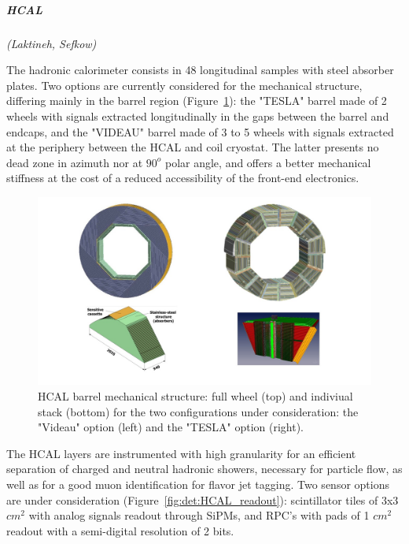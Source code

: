\vspace{1cm}
\subparagraph*{\bf HCAL}
\textit{(Laktineh, Sefkow)}

The hadronic calorimeter consists in 48 longitudinal samples with steel absorber plates. Two options are currently considered for the mechanical structure, differing mainly in the barrel region (Figure~\ref{fig:det:HCAL}): the "TESLA" barrel made of 2 wheels with signals extracted longitudinally in the gaps between the barrel and endcaps, and the "VIDEAU" barrel made of 3 to 5 wheels with signals extracted at the periphery between the HCAL and coil cryostat. The latter presents no dead zone in azimuth nor at $90^o$ polar angle, and offers a better mechanical stiffness at the cost of a reduced accessibility of the front-end electronics.

\begin{figure}[t!]
\centering
\includegraphics[width=1.1\hsize]{Detector/fig/HCAL_structure.jpg}
\caption{HCAL barrel mechanical structure: full wheel (top) and indiviual stack (bottom) for the two configurations under consideration: the "Videau" option (left) and the "TESLA" option (right).}
\label{fig:det:HCAL}
\end{figure}

The HCAL layers are instrumented with high granularity for an efficient separation of charged and neutral hadronic showers, necessary for particle flow, as well as for a good muon identification for flavor jet tagging. Two sensor options are under consideration (Figure~\ref{fig:det:HCAL_readout}): scintillator tiles of 3x3 $cm^2$ with analog signals readout through SiPMs, and RPC's with pads of 1 $cm^2$ readout with a semi-digital resolution of 2 bits.

